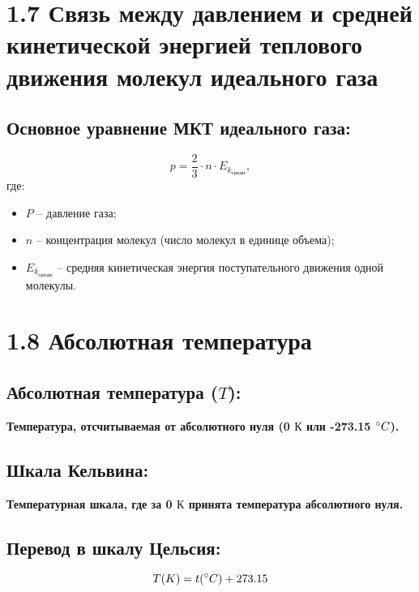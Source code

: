 \documentclass[a4paper,12pt]{article}
\begin{document}
\section*{1.7 Связь между давлением и средней кинетической энергией теплового движения молекул идеального газа}


\vspace{-9pt}
\subsection*{Основное уравнение МКТ идеального газа:}
\vspace{-3pt}
$$ p = \frac{2}{3} \cdot n \cdot E_{k_{средн}}, $$
где:
\begin{itemize} [itemsep=0pt, topsep=0pt, parsep=0pt, label=\textbullet, font=\normalfont]
    \item $P$ – давление газа;
    \item $n$ – концентрация молекул (число молекул в единице объема);
    \item $E_{k_{средн}}$ – средняя кинетическая энергия поступательного движения одной молекулы.
\end{itemize}


\section*{1.8 Абсолютная температура}

\vspace{-9pt}
\subsection*{Абсолютная температура ($T$):}
\vspace{-3pt}
\textbf{Температура, отсчитываемая от абсолютного нуля (0 $К$ или -273.15 $\degree C$).}

\vspace{-9pt}
\subsection*{Шкала Кельвина:}
\vspace{-3pt}
\textbf{Температурная шкала, где за 0 $К$ принята температура абсолютного нуля.}

\vspace{-9pt}
\subsection*{ Перевод в шкалу Цельсия:}
\vspace{-3pt}
$$T(K) = t(\degree C) + 273.15$$
\end{document}
